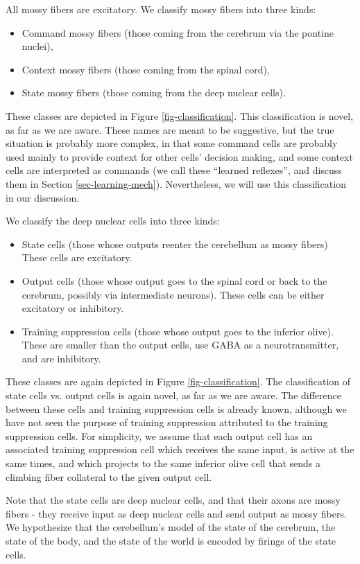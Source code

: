 \documentclass{article}
\theoremstyle{definition}
\begin{document}
All mossy fibers are excitatory. We classify mossy fibers into three
kinds:
\begin{itemize}
\item Command mossy fibers (those coming from
the cerebrum via the pontine nuclei), 
\item Context mossy fibers (those coming from the
spinal cord),  
\item State mossy fibers (those coming from the deep nuclear
cells). 
\end{itemize}
These classes are depicted in Figure \ref{fig-classification}. This
classification is novel, as far as we are aware. These names are meant
to be suggestive, but the true situation is probably more complex, in
that some command cells are probably used mainly to provide context
for other cells' decision making, and some context cells are
interpreted as commands (we call these ``learned reflexes'', and
discuss them in Section \ref{sec-learning-mech}). Nevertheless, we
will use this classification in our discussion.

We classify the deep nuclear cells into three kinds: 
\begin{itemize}
\item State cells (those whose outputs reenter the cerebellum as mossy fibers)
  These cells are excitatory.
\item Output cells (those whose output goes to the spinal cord or back
  to the cerebrum, possibly via intermediate neurons). These cells can
  be either excitatory or inhibitory.
\item Training suppression cells (those whose output goes to the
  inferior olive). These are smaller than the output cells, use GABA
  as a neurotransmitter, and are inhibitory.
\end{itemize}
These classes are again depicted in Figure \ref{fig-classification}.
The classification of state cells vs. output cells is again novel, as
far as we are aware. The difference between these cells and training
suppression cells is already known, although we have not seen the
purpose of training suppression attributed to the training suppression
cells. For simplicity, we assume that each output cell has an
associated training suppression cell which receives the same input, is
active at the same times, and which projects to the same inferior
olive cell that sends a climbing fiber collateral to the given output
cell.

Note that the state cells are deep nuclear cells, and that their axons
are mossy fibers - they receive input as deep nuclear cells and send
output as mossy fibers. We hypothesize that the cerebellum's model of
the state of the cerebrum, the state of the body, and the state of the
world is encoded by firings of the state cells.
\end{document}
